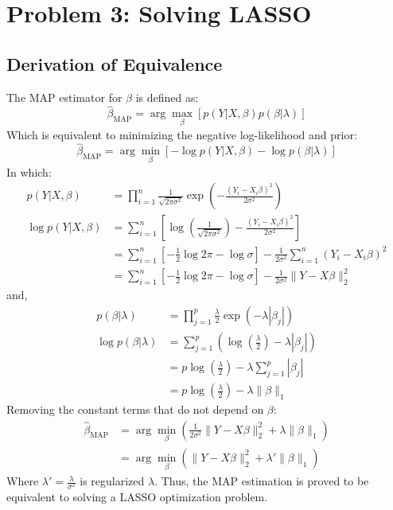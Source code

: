 \documentclass[11pt, a4paper, oneside]{memoir}
\begin{document}
\chapter{Problem 3: Solving LASSO}
\section{Derivation of Equivalence}
The MAP estimator for $\beta$ is defined as:
\[ \hat{\beta}_{\text{MAP}}  = \arg \max_{\beta} \left[ p(Y | X, \beta) p(\beta | \lambda) \right] \]
Which is equivalent to minimizing the negative log-likelihood and prior:
\[ \hat{\beta}_{\text{MAP}} = \arg \min_{\beta} \left[ -\log p(Y | X, \beta) - \log p(\beta | \lambda) \right] \]
In which:
\begin{align*}
p(Y | X, \beta) &= \prod_{i=1}^{n} \frac{1}{\sqrt{2\pi\sigma^2}} \exp \left( -\frac{(Y_i - X_i\beta)^2}{2\sigma^2} \right) \\
\log p(Y | X, \beta) &= \sum_{i=1}^{n} \left[ \log \left( \frac{1}{\sqrt{2\pi\sigma^2}} \right) - \frac{(Y_i - X_i\beta)^2}{2\sigma^2} \right] \\
&= \sum_{i=1}^{n} \left[ -\frac{1}{2}\log{2\pi} -\log\sigma \right] - \frac{1}{2\sigma^2} \sum_{i=1}^{n} (Y_i - X_i\beta)^2 \\
&= \sum_{i=1}^{n} \left[ -\frac{1}{2}\log{2\pi} -\log\sigma \right] - \frac{1}{2\sigma^2} \|Y - X\beta\|_2^2
\end{align*}
and,
\begin{align*}
p(\beta | \lambda) &= \prod_{j=1}^{p} \frac{\lambda}{2} \exp (-\lambda |\beta_j|) \\
\log p(\beta | \lambda) &= \sum_{j=1}^{p} \left( \log \left( \frac{\lambda}{2} \right) - \lambda |\beta_j| \right) \\
&= p \log \left( \frac{\lambda}{2} \right) - \lambda \sum_{j=1}^{p} |\beta_j| \\
&= p \log \left( \frac{\lambda}{2} \right) - \lambda \|\beta\|_1
\end{align*}
Removing the constant terms that do not depend on $\beta$:
\begin{align*}
\hat{\beta}_{\text{MAP}} &= \arg \min_{\beta} \left( \frac{1}{2\sigma^2} \|Y - X\beta\|_2^2 + \lambda \|\beta\|_1 \right) \\
&= \arg \min_{\beta} \left( \|Y - X\beta\|_2^2 + \lambda' \|\beta\|_1 \right)
\end{align*}
Where $\lambda' = \frac{\lambda}{\sigma^2}$ is regularized $\lambda$. Thus, the MAP estimation is proved to be equivalent to solving a LASSO optimization problem.
\end{document}
